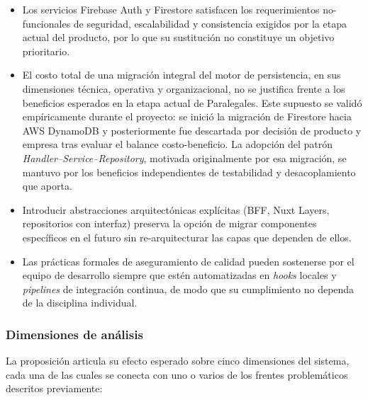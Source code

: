 \begin{itemize}
  \item Los servicios Firebase Auth y Firestore satisfacen los requerimientos no-funcionales de seguridad, escalabilidad y consistencia exigidos por la etapa actual del producto, por lo que su sustitución no constituye un objetivo prioritario.
  \item El costo total de una migración integral del motor de persistencia, en sus dimensiones técnica, operativa y organizacional, no se justifica frente a los beneficios esperados en la etapa actual de Paralegales. Este supuesto se validó empíricamente durante el proyecto: se inició la migración de Firestore hacia AWS DynamoDB y posteriormente fue descartada por decisión de producto y empresa tras evaluar el balance costo-beneficio. La adopción del patrón \textit{Handler--Service--Repository}, motivada originalmente por esa migración, se mantuvo por los beneficios independientes de testabilidad y desacoplamiento que aporta.
  \item Introducir abstracciones arquitectónicas explícitas (BFF, Nuxt Layers, repositorios con interfaz) preserva la opción de migrar componentes específicos en el futuro sin re-arquitecturar las capas que dependen de ellos.
  \item Las prácticas formales de aseguramiento de calidad pueden sostenerse por el equipo de desarrollo siempre que estén automatizadas en \textit{hooks} locales y \textit{pipelines} de integración continua, de modo que su cumplimiento no dependa de la disciplina individual.
\end{itemize}

\subsubsection*{Dimensiones de análisis}

La proposición articula su efecto esperado sobre cinco dimensiones del sistema, cada una de las cuales se conecta con uno o varios de los frentes problemáticos descritos previamente:

